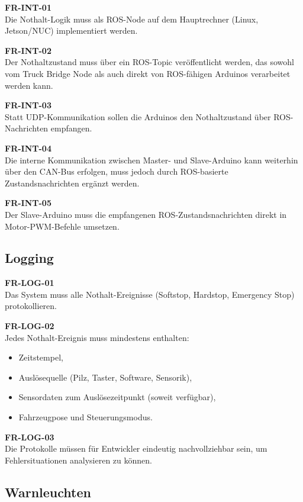 \textbf{FR-INT-01}\\
Die Nothalt-Logik muss als ROS-Node auf dem Hauptrechner (Linux, Jetson/NUC) implementiert werden.

\textbf{FR-INT-02}\\
Der Nothaltzustand muss über ein ROS-Topic veröffentlicht werden, das sowohl vom Truck Bridge Node als auch direkt von ROS-fähigen Arduinos verarbeitet werden kann.

\textbf{FR-INT-03}\\
Statt UDP-Kommunikation sollen die Arduinos den Nothaltzustand über ROS-Nachrichten empfangen.

\textbf{FR-INT-04}\\
Die interne Kommunikation zwischen Master- und Slave-Arduino kann weiterhin über den CAN-Bus erfolgen, muss jedoch durch ROS-basierte Zustandsnachrichten ergänzt werden.

\textbf{FR-INT-05}\\
Der Slave-Arduino muss die empfangenen ROS-Zustandsnachrichten direkt in Motor-PWM-Befehle umsetzen.


\subsection{Logging}
\label{sec:logging}

\textbf{FR-LOG-01}\\
Das System muss alle Nothalt-Ereignisse (\ac{Softstop}, \ac{Hardstop}, Emergency Stop) protokollieren.

\textbf{FR-LOG-02}\\
Jedes Nothalt-Ereignis muss mindestens enthalten:
\begin{itemize}
    \item Zeitstempel,
    \item Auslösequelle (Pilz, Taster, Software, Sensorik),
    \item Sensordaten zum Auslösezeitpunkt (soweit verfügbar),
    \item Fahrzeugpose und Steuerungsmodus.
\end{itemize}

\textbf{FR-LOG-03}\\
Die Protokolle müssen für Entwickler eindeutig nachvollziehbar sein, um Fehlersituationen analysieren zu können.


\subsection{Warnleuchten}
\label{sec:warnleuchten}

